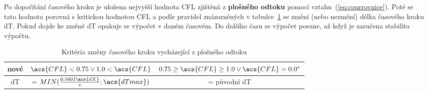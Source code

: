   Po dopočítání časového kroku je uložena nejvyšší hodnota \acs{CFL} zjištěná z {\bf plošného odtoku} pomocí vztahu~(\ref{eq:courrovnice}). Poté se tato hodnota porovná s kritickou hodnotou \acs{CFL} a podle pravidel znázorněných v tabulce~\ref{tab:cflsheet} se změní (nebo nezmění) délka časového kroku \acs{dT}. Pokud dojde ke změně \acs{dT} opakuje se výpočet v daném časovém. Do dalšího času se výpočet posune, až když je zaručena stabilita výpočtu. 
  
  \begin{table}[t!]
    \centering
    \caption{Kritéria změny časového kroku vycházející z plošného odtoku}
    \label{tab:cflsheet}
    \begin{tabular}{ccc}
      \hline
        nové  &  $\acs{CFL} < 0.75 \lor 1.0 < \acs{CFL}$ & $ 0.75 \geq \acs{CFL} \geq 1.0 \lor \acs{CFL} = 0.0^*$ \\
        \hline
        \hline
        \acs{dT} &  = $MIN(\frac{0.5601\acs{dX}}{v};\acs{dTmax})$ & = původní \acs{dT}\\
        \hline
    \end{tabular}
  \end{table}

